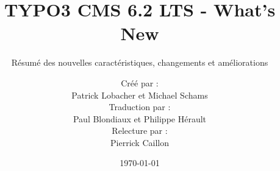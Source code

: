 %

%
%

\documentclass[t]{beamer}

\beamertemplatenavigationsymbolsempty

{
	\usetheme{typo3slides}
}

\title{TYPO3 CMS 6.2 LTS - What's New}
\subtitle{Résumé des nouvelles caractéristiques, changements et améliorations}
\author{
	\centerline{Créé par :}
	\centerline{Patrick Lobacher et Michael Schams}
	\vspace{0.2cm}
	\centerline{Traduction par :}
	Paul Blondiaux et Philippe Hérault
	\centerline{Relecture par :}
	Pierrick Caillon
}
\date{\today}



\sharefont


\begingroup
	[default]
	\begin{frame}
		\titlepage
	\end{frame}
\endgroup



